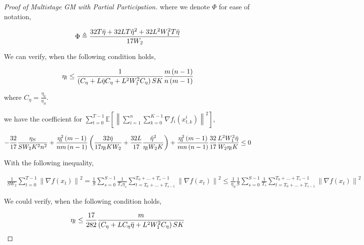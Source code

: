 \begin{proof}[Proof of Multistage GM with Partial Participation]
where we denote $\Phi$ for ease of notation,

\begin{equation}
\begin{gathered}
\Phi \triangleq \frac{32 T \Bar{\eta} + 32 L T \hat{\eta}^2 + 32 L^2 W_1^2 T \Bar{\eta}}{17 W_2}
\end{gathered}\nonumber
\end{equation}

We can verify, when the following condition holds,

\begin{equation}
\begin{gathered}
\eta_l \leq \frac{1}{\left( C_\eta + L \Bar{\eta} C_\eta + L^2 W_1^2 C_\eta \right) S K}\frac{m\left(n-1\right)}{n\left(m-1\right)}
\end{gathered}\nonumber
\end{equation}

where $C_\eta=\frac{\eta_0}{\eta_S}$.


we have the coefficient for $\sum_{t=0}^{T-1} \mathbb{E}\left[\left\| \sum_{i=1}^n\sum_{k=0}^{K-1} \nabla f_i(x_{t,k}^i)\right\|^2\right]$,

\begin{equation}
\begin{gathered}
- \frac{32}{17}\frac{\eta_S}{S W_2 K^2 n^2} + \frac{\eta_l^2 \left(m-1\right)}{nm\left(n-1\right)} \left(\frac{32 \Bar{\eta}}{17 \eta_l K W_2} + \frac{32 L}{17}\frac{\hat{\eta}^2}{\eta_l W_2 K}\right) + \frac{\eta_l^2\left(m-1\right)}{mn\left(n-1\right)} \frac{32}{17} \frac{L^2 W_1^2 \Bar{\eta}}{W_2 \eta_l K} \leq 0
\end{gathered}\nonumber
\end{equation}

With the following inequality,

\begin{equation}
\begin{gathered}
\frac{1}{S W_2}\sum_{t=0}^{T-1}\left\|\nabla f(x_t)\right\|^2 = \frac{1}{S}\sum_{s=0}^{S-1} \frac{1}{T_s \eta_s}\sum_{t=T_0+\dots+T_{s-1} }^{T_0+\dots+T_s-1} \left\|\nabla f(x_t)\right\|^2 \leq \frac{1}{\eta_S} \frac{1}{S}\sum_{s=0}^{S-1} \frac{1}{T_s}\sum_{t=T_0+\dots+T_{s-1} }^{T_0+\dots+T_s-1} \left\|\nabla f(x_t)\right\|^2
\end{gathered}\nonumber
\end{equation}


We could verify, when the following condition holds,

\begin{equation}
\begin{gathered}
\eta_l \leq \frac{17}{282} \frac{m}{\left(C_\eta + L C_\eta \Bar{\eta} + L^2 W_1^2 C_\eta\right)S K}
\end{gathered}\nonumber
\end{equation}


\end{proof}
